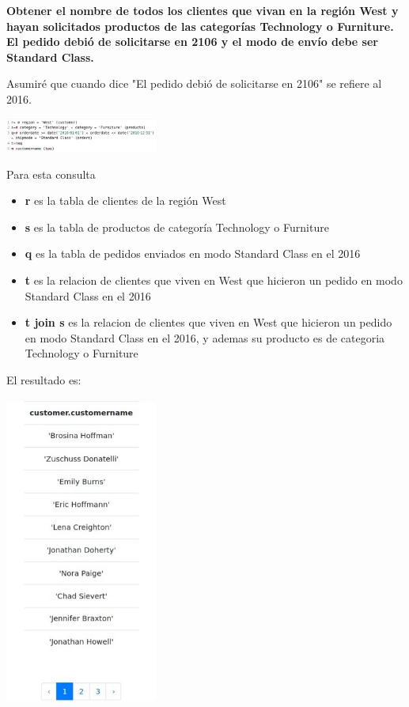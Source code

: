 \textbf{Obtener el nombre de todos los clientes que vivan en la región West y hayan solicitados productos de las categorías Technology o Furniture. El pedido debió de solicitarse en 2106 y el modo de envío debe ser Standard Class.}

Asumiré que cuando dice "El pedido debió de solicitarse en 2106" se refiere al 2016. 

\begin{center}
    \includegraphics[width=5cm]{resources/pregunta2/2.3.1}
\end{center}
Para esta consulta 
\begin{itemize}
    \item \textbf{r} es la tabla de clientes de la región West
    \item \textbf{s} es la tabla de productos de categoría Technology o Furniture
    \item \textbf{q} es la tabla de pedidos enviados en modo Standard Class en el 2016
    \item \textbf{t} es la relacion de clientes que viven en West que hicieron un pedido en modo Standard Class en el 2016
    \item \textbf{t join s} es la relacion de clientes que viven en West que hicieron un pedido en modo Standard Class en el 2016, y ademas su producto es de categoria Technology o Furniture
\end{itemize}

El resultado es:
\begin{center}
    \includegraphics[width=5cm]{resources/pregunta2/2.3.2}
\end{center}

